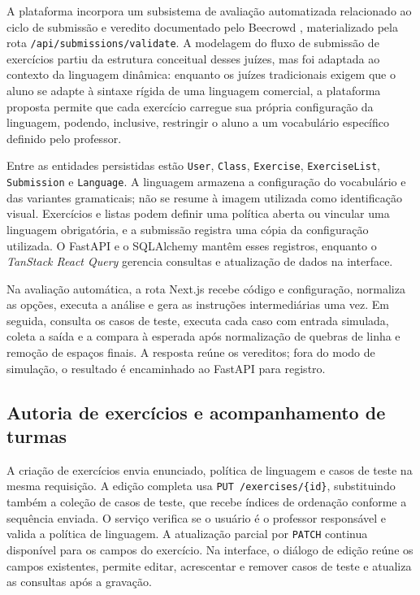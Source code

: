 A plataforma incorpora um subsistema de avaliação automatizada relacionado ao ciclo de submissão e veredito documentado pelo Beecrowd \cite{beecrowd2026faq}, materializado pela rota \texttt{/api/submissions/validate}. A modelagem do fluxo de submissão de exercícios partiu da estrutura conceitual desses juízes, mas foi adaptada ao contexto da linguagem dinâmica: enquanto os juízes tradicionais exigem que o aluno se adapte à sintaxe rígida de uma linguagem comercial, a plataforma proposta permite que cada exercício carregue sua própria configuração da linguagem, podendo, inclusive, restringir o aluno a um vocabulário específico definido pelo professor.


Entre as entidades persistidas estão \texttt{User}, \texttt{Class}, \texttt{Exercise}, \texttt{ExerciseList}, \texttt{Submission} e \texttt{Language}. A linguagem armazena a configuração do vocabulário e das variantes gramaticais; não se resume à imagem utilizada como identificação visual. Exercícios e listas podem definir uma política aberta ou vincular uma linguagem obrigatória, e a submissão registra uma cópia da configuração utilizada. O FastAPI e o SQLAlchemy mantêm esses registros, enquanto o \textit{TanStack React Query} gerencia consultas e atualização de dados na interface.

Na avaliação automática, a rota Next.js recebe código e configuração, normaliza as opções, executa a análise e gera as instruções intermediárias uma vez. Em seguida, consulta os casos de teste, executa cada caso com entrada simulada, coleta a saída e a compara à esperada após normalização de quebras de linha e remoção de espaços finais. A resposta reúne os vereditos; fora do modo de simulação, o resultado é encaminhado ao FastAPI para registro.

\subsection{Autoria de exercícios e acompanhamento de turmas}

A criação de exercícios envia enunciado, política de linguagem e casos de teste na mesma requisição. A edição completa usa \texttt{PUT /exercises/}\allowbreak\texttt{\{id\}}, substituindo também a coleção de casos de teste, que recebe índices de ordenação conforme a sequência enviada. O serviço verifica se o usuário é o professor responsável e valida a política de linguagem. A atualização parcial por \texttt{PATCH} continua disponível para os campos do exercício. Na interface, o diálogo de edição reúne os campos existentes, permite editar, acrescentar e remover casos de teste e atualiza as consultas após a gravação.

